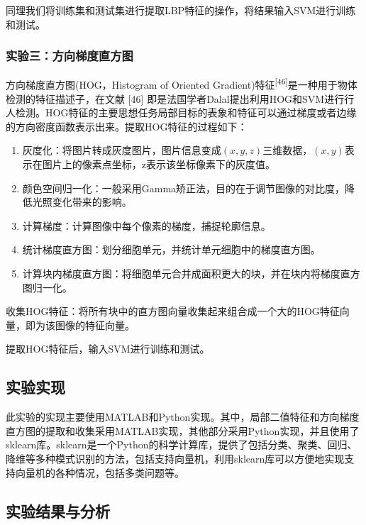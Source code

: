 \documentclass[bachelor,zhspacing]{cqu}  %
\def\tightlist{}
\begin{document}
同理我们将训练集和测试集进行提取LBP特征的操作，将结果输入SVM进行训练和测试。

\subsubsection{实验三：方向梯度直方图}\label{ux5b9eux9a8cux4e09ux65b9ux5411ux68afux5ea6ux76f4ux65b9ux56fe}

方向梯度直方图(HOG，Histogram of Oriented
Gradient)特征\textsuperscript{{[}46{]}}是一种用于物体检测的特征描述子，在文献
{[}46{]}
即是法国学者Dalal提出利用HOG和SVM进行行人检测。HOG特征的主要思想任务局部目标的表象和特征可以通过梯度或者边缘的方向密度函数表示出来。提取HOG特征的过程如下：

\begin{enumerate}
\def\labelenumi{\arabic{enumi}.}
\tightlist
\item
  灰度化：将图片转成灰度图片，图片信息变成\((x,y,z)\)三维数据，\((x,y)\)表示在图片上的像素点坐标，z表示该坐标像素下的灰度值。
\item
  颜色空间归一化：一般采用Gamma矫正法，目的在于调节图像的对比度，降低光照变化带来的影响。
\item
  计算梯度：计算图像中每个像素的梯度，捕捉轮廓信息。
\item
  统计梯度直方图：划分细胞单元，并统计单元细胞中的梯度直方图。
\item
  计算块内梯度直方图：将细胞单元合并成面积更大的块，并在块内将梯度直方图归一化。
\end{enumerate}

收集HOG特征：将所有块中的直方图向量收集起来组合成一个大的HOG特征向量，即为该图像的特征向量。

提取HOG特征后，输入SVM进行训练和测试。

\subsection{实验实现}\label{ux5b9eux9a8cux5b9eux73b0}

此实验的实现主要使用MATLAB和Python实现。其中，局部二值特征和方向梯度直方图的提取和收集采用MATLAB实现，其他部分采用Python实现，并且使用了sklearn库。sklearn是一个Python的科学计算库，提供了包括分类、聚类、回归、降维等多种模式识别的方法，包括支持向量机，利用sklearn库可以方便地实现支持向量机的各种情况，包括多类问题等。

\subsection{实验结果与分析}\label{ux5b9eux9a8cux7ed3ux679cux4e0eux5206ux6790-1}
\end{document}
